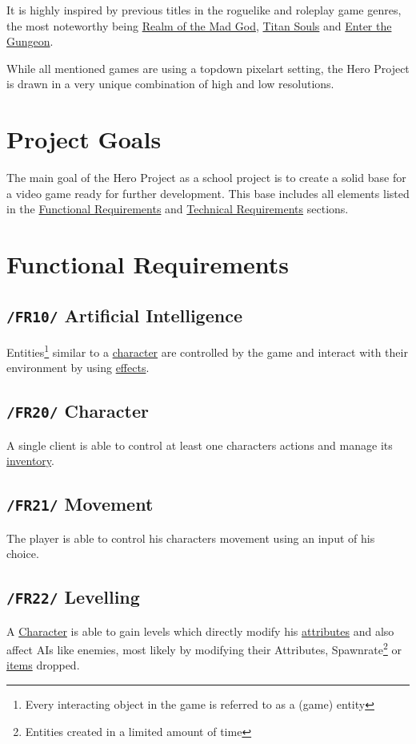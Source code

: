 \documentclass[11pt]{article}
\begin{document}
It is highly inspired by previous titles in the roguelike and roleplay game genres, the most noteworthy being \href{https://realmofthemadgod.com}{Realm of the Mad God}, \href{http://www.devolverdigital.com/games/view/titan-souls}{Titan Souls} and \href{http://dodgeroll.com/gungeon/}{Enter the Gungeon}.

While all mentioned games are using a topdown pixelart setting, the Hero Project is drawn in a very unique combination of high and low resolutions.

\section{Project Goals}
The main goal of the Hero Project as a school project is to create a solid base for a video game ready for further development.
This base includes all elements listed in the \hyperref[sec:fr]{Functional Requirements} and \hyperref[sec:tr]{Technical Requirements} sections.

\newpage

\section{Functional Requirements}\label{sec:fr}
\subsection{\texttt{/FR10/} Artificial Intelligence}\label{subsec:fr10ai}
Entities\footnote{Every interacting object in the game is referred to as a (game) entity} similar to a \hyperref[subsec:fr20character]{character} are controlled by the game and interact with their environment by using \hyperref[subsec:fr30effects]{effects}.
\subsection{\texttt{/FR20/} Character}\label{subsec:fr20character}
A single client is able to control at least one characters actions and manage its \hyperref[subsec:fr41inventory]{inventory}.
\subsection{\texttt{/FR21/} Movement}\label{subsec:fr21movement}
The player is able to control his characters movement using an input of his choice.
\subsection{\texttt{/FR22/} Levelling}\label{subsec:fr22levelling}
A \hyperref[subsec:fr20character]{Character} is able to gain levels which directly modify his \hyperref[subsec:fr50attributes]{attributes} and also affect AIs like enemies, most likely by modifying their Attributes, Spawnrate\footnote{Entities created in a limited amount of time} or \hyperref[subsec:fr40items]{items} dropped.
\end{document}

